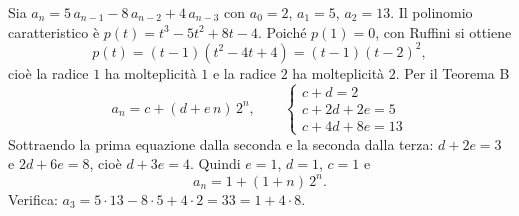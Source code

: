 \documentclass[11pt,a4paper]{article}
\begin{document}
\begin{esempio}
Sia $a_n = 5\, a_{n-1} - 8\, a_{n-2} + 4\, a_{n-3}$ con $a_0 = 2$, $a_1 = 5$,
$a_2 = 13$. Il polinomio caratteristico è $p(t) = t^3 - 5t^2 + 8t - 4$.
Poiché $p(1) = 0$, con Ruffini si ottiene
\[
  p(t) = (t - 1)(t^2 - 4t + 4) = (t - 1)(t - 2)^2 ,
\]
cioè la radice $1$ ha molteplicità $1$ e la radice $2$ ha molteplicità $2$.
Per il Teorema B
\[
  a_n = c + (d + e\, n)\, 2^n ,
  \qquad
  \begin{cases}
    c + d = 2 \\
    c + 2d + 2e = 5 \\
    c + 4d + 8e = 13
  \end{cases}
\]
Sottraendo la prima equazione dalla seconda e la seconda dalla terza:
$d + 2e = 3$ e $2d + 6e = 8$, cioè $d + 3e = 4$. Quindi $e = 1$, $d = 1$,
$c = 1$ e
\[
  a_n = 1 + (1 + n)\, 2^n .
\]
Verifica: $a_3 = 5 \cdot 13 - 8 \cdot 5 + 4 \cdot 2 = 33 = 1 + 4 \cdot 8$.
\end{esempio}
\end{document}
